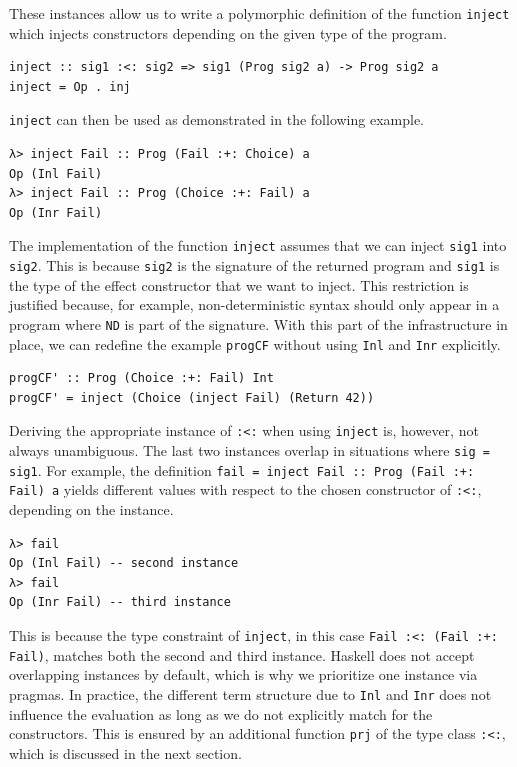 \documentclass[a4paper, 11pt, fleqn, twoside]{scrreprt}
\newcommand{\hinl}[1]{\texttt{#1}}
\begin{document}
These instances allow us to write a polymorphic definition of the function \hinl{inject} which injects constructors depending on the given type of the program.

\begin{verbatim}
inject :: sig1 :<: sig2 => sig1 (Prog sig2 a) -> Prog sig2 a
inject = Op . inj
\end{verbatim}

\hinl{inject} can then be used as demonstrated in the following example.

\begin{verbatim}
λ> inject Fail :: Prog (Fail :+: Choice) a
Op (Inl Fail)
λ> inject Fail :: Prog (Choice :+: Fail) a
Op (Inr Fail)
\end{verbatim}

The implementation of the function \hinl{inject} assumes that we can inject \hinl{sig1} into \hinl{sig2}.
This is because \hinl{sig2} is the signature of the returned program and \hinl{sig1} is the type of the effect constructor that we want to inject.
This restriction is justified because, for example, non-deterministic syntax should only appear in a program where \hinl{ND} is part of the signature.
With this part of the infrastructure in place, we can redefine the example \hinl{progCF} without using \hinl{Inl} and \hinl{Inr} explicitly.

\begin{verbatim}
progCF' :: Prog (Choice :+: Fail) Int
progCF' = inject (Choice (inject Fail) (Return 42))
\end{verbatim}

Deriving the appropriate instance of \hinl{:<:} when using \hinl{inject} is, however, not always unambiguous.
The last two instances overlap in situations where \hinl{sig = sig1}.
For example, the definition \hinl{fail = inject Fail :: Prog (Fail :+: Fail) a} yields different values with respect to the chosen constructor of \hinl{:<:}, depending on the instance.

\begin{verbatim}
λ> fail
Op (Inl Fail) -- second instance
λ> fail
Op (Inr Fail) -- third instance
\end{verbatim}

This is because the type constraint of \hinl{inject}, in this case \hinl{Fail :<: (Fail :+: Fail)}, matches both the second and third instance.
Haskell does not accept overlapping instances by default, which is why we prioritize one instance via pragmas.
In practice, the different term structure due to \hinl{Inl} and \hinl{Inr} does not influence the evaluation as long as we do not explicitly match for the constructors.
This is ensured by an additional function \hinl{prj} of the type class \hinl{:<:}, which is discussed in the next section.
\end{document}
